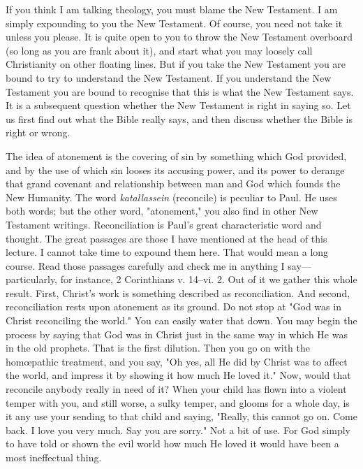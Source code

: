 \documentclass[12pt,a5paper,twoside,titlepage]{book}
\begin{document}
If you think I am talking theology, you must 
blame the New Testament. I am simply expounding 
to you the New Testament. Of course, 
you need not take it unless you please. It is 
quite open to you to throw the New Testament 
overboard (so long as you are frank 
about it), and start what you may loosely call 
Christianity on other floating lines. But if you 
take the New Testament you are bound to try to 
understand the New Testament. If you understand 
the New Testament you are bound to 
recognise that this is what the New Testament 
says. It is a subsequent question whether the 
New Testament is right in saying so. Let us 
first find out what the Bible really says, and then 
discuss whether the Bible is right or wrong. 

The idea of atonement is the covering of sin 
by something which God provided, and by the 
use of which sin looses its accusing power, and 
its power to derange that grand covenant and 
relationship between man and God which founds 
the New Humanity. The word \textit{katallassein} (reconcile) 
is peculiar to Paul. He uses both words; 
but the other word, "atonement," you also find in 
other New Testament writings. Reconciliation 
is Paul's great characteristic word and thought. 
The great passages are those I have mentioned 
at the head of this lecture. I cannot take time 
to expound them here. That would mean a long 
course. Read those passages carefully and 
check me in anything I say---particularly, for 
instance, 2 Corinthians v. 14--vi. 2. Out of it we 
gather this whole result. First, Christ's work 
is something described as reconciliation. And 
second, reconciliation rests upon atonement as 
its ground. Do not stop at "God was in Christ 
reconciling the world." You can easily water 
that down. You may begin the process by 
saying that God was in Christ just in the same 
way in which He was in the old prophets. That 
is the first dilution. Then you go on with the 
hom{\oe}pathic treatment, and you say, "Oh yes, 
all He did by Christ was to affect the world, and 
impress it by showing it how much He loved it." 
Now, would that reconcile anybody really in 
need of it? When your child has flown into a 
violent temper with you, and still worse, a sulky 
temper, and glooms for a whole day, is it any 
use your sending to that child and saying, 
"Really, this cannot go on. Come back. I love 
you very much. Say you are sorry." Not 
a bit of use. For God simply to have told 
or shown the evil world how much He loved 
it would have been a most ineffectual thing. 
\end{document}

